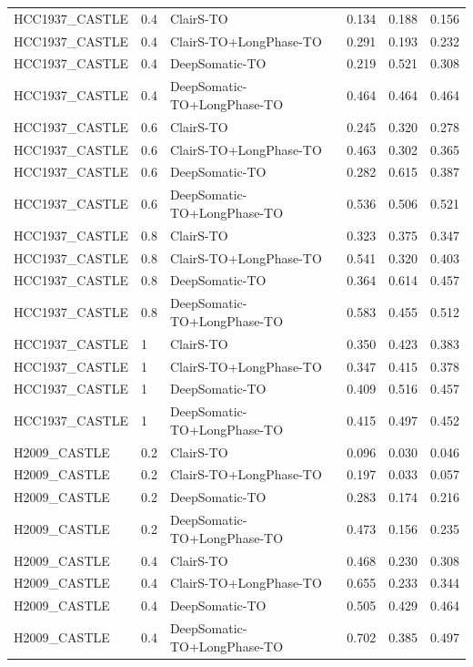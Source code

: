 \documentclass[pdflatex,sn-nature]{sn-jnl}
\begin{document}
{\begin{longtable}{@{}lllccc@{}}
  HCC1937\_CASTLE & 0.4 & ClairS-TO & 0.134 & 0.188 & 0.156 \\
  HCC1937\_CASTLE & 0.4 & ClairS-TO+LongPhase-TO & 0.291 & 0.193 & 0.232 \\
  HCC1937\_CASTLE & 0.4 & DeepSomatic-TO & 0.219 & 0.521 & 0.308 \\
  HCC1937\_CASTLE & 0.4 & DeepSomatic-TO+LongPhase-TO & 0.464 & 0.464 & 0.464 \\
  HCC1937\_CASTLE & 0.6 & ClairS-TO & 0.245 & 0.320 & 0.278 \\
  HCC1937\_CASTLE & 0.6 & ClairS-TO+LongPhase-TO & 0.463 & 0.302 & 0.365 \\
  HCC1937\_CASTLE & 0.6 & DeepSomatic-TO & 0.282 & 0.615 & 0.387 \\
  HCC1937\_CASTLE & 0.6 & DeepSomatic-TO+LongPhase-TO & 0.536 & 0.506 & 0.521 \\
  HCC1937\_CASTLE & 0.8 & ClairS-TO & 0.323 & 0.375 & 0.347 \\
  HCC1937\_CASTLE & 0.8 & ClairS-TO+LongPhase-TO & 0.541 & 0.320 & 0.403 \\
  HCC1937\_CASTLE & 0.8 & DeepSomatic-TO & 0.364 & 0.614 & 0.457 \\
  HCC1937\_CASTLE & 0.8 & DeepSomatic-TO+LongPhase-TO & 0.583 & 0.455 & 0.512 \\
  HCC1937\_CASTLE & 1 & ClairS-TO & 0.350 & 0.423 & 0.383 \\
  HCC1937\_CASTLE & 1 & ClairS-TO+LongPhase-TO & 0.347 & 0.415 & 0.378 \\
  HCC1937\_CASTLE & 1 & DeepSomatic-TO & 0.409 & 0.516 & 0.457 \\
  HCC1937\_CASTLE & 1 & DeepSomatic-TO+LongPhase-TO & 0.415 & 0.497 & 0.452 \\
  \addlinespace
  H2009\_CASTLE & 0.2 & ClairS-TO & 0.096 & 0.030 & 0.046 \\
  H2009\_CASTLE & 0.2 & ClairS-TO+LongPhase-TO & 0.197 & 0.033 & 0.057 \\
  H2009\_CASTLE & 0.2 & DeepSomatic-TO & 0.283 & 0.174 & 0.216 \\
  H2009\_CASTLE & 0.2 & DeepSomatic-TO+LongPhase-TO & 0.473 & 0.156 & 0.235 \\
  H2009\_CASTLE & 0.4 & ClairS-TO & 0.468 & 0.230 & 0.308 \\
  H2009\_CASTLE & 0.4 & ClairS-TO+LongPhase-TO & 0.655 & 0.233 & 0.344 \\
  H2009\_CASTLE & 0.4 & DeepSomatic-TO & 0.505 & 0.429 & 0.464 \\
  H2009\_CASTLE & 0.4 & DeepSomatic-TO+LongPhase-TO & 0.702 & 0.385 & 0.497 \\

\end{longtable}}
\end{document}
